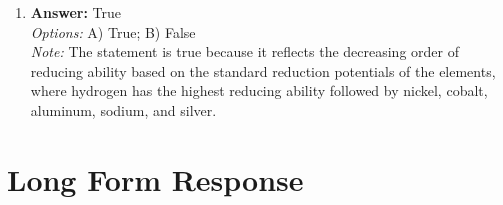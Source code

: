 \documentclass[12pt]{article}
\begin{document}
\begin{enumerate}[label=\arabic*.]
\\ \textit{Note:} The statement is false because an alcohol contains a hydroxyl (-OH) functional group, which includes an oxygen atom, thus disqualifying it from being classified purely as a hydrocarbon.
\item \textbf{Answer:} True
\\ \textit{Options:} A) True; B) False
\\ \textit{Note:} The statement is true because it reflects the decreasing order of reducing ability based on the standard reduction potentials of the elements, where hydrogen has the highest reducing ability followed by nickel, cobalt, aluminum, sodium, and silver.
\end{enumerate}

\section*{Long Form Response}
\end{document}
